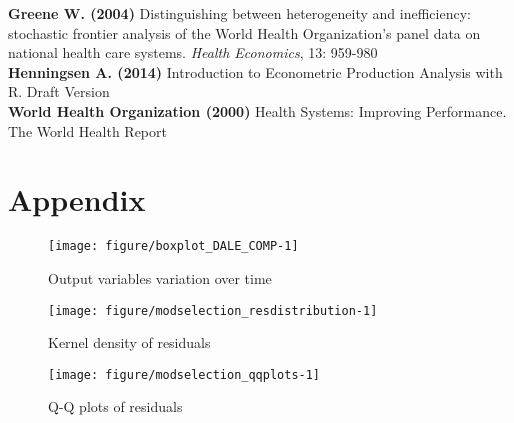 \documentclass[12pt,a4paper]{article}\usepackage[]{graphicx}\usepackage[]{color}
\newenvironment{knitrout}{}{} %
\begin{document}
\textbf{Greene W. (2004)} Distinguishing between heterogeneity and inefficiency: stochastic frontier analysis of the World Health Organization's panel data on national health care systems. \textit{Health Economics}, 13: 959-980 \\

\textbf{Henningsen A. (2014)} Introduction to Econometric Production Analysis with R. Draft Version \\

\textbf{World Health Organization (2000)} Health Systems: Improving Performance. The World Health Report



\newpage
\section{Appendix}


\begin{knitrout}
\color{fgcolor}\begin{figure}[htbp]

{\centering \texttt{[image: figure/boxplot\_DALE\_COMP-1]} 

}

\caption[Output variables variation over time]{Output variables variation over time}\label{fig:boxplot_DALE_COMP}
\end{figure}


\end{knitrout}

\begin{knitrout}
\color{fgcolor}\begin{figure}[htbp]

{\centering \texttt{[image: figure/modselection\_resdistribution-1]} 

}

\caption[Kernel density of residuals]{Kernel density of residuals}\label{fig:modselection_resdistribution}
\end{figure}


\end{knitrout}

\begin{knitrout}
\color{fgcolor}\begin{figure}[htbp]

{\centering \texttt{[image: figure/modselection\_qqplots-1]} 

}

\caption[Q-Q plots of residuals]{Q-Q plots of residuals}\label{fig:modselection_qqplots}
\end{figure}


\end{knitrout}









\end{document}
